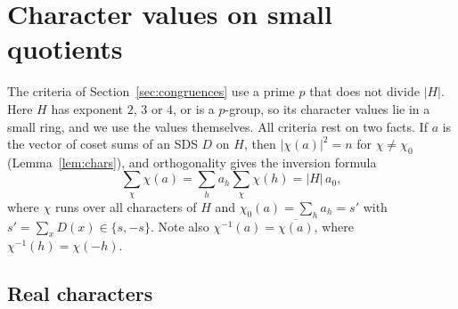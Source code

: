
\section{Character values on small quotients}\label{sec:characters}

The criteria of Section~\ref{sec:congruences} use a prime $p$ that does not divide $|H|$. Here
$H$ has exponent $2$, $3$ or $4$, or is a $p$-group, so its character values lie in a small ring,
and we use the values themselves. All criteria rest on two facts. If $a$ is the vector of coset
sums of an SDS $D$ on $H$, then $|\chi(a)|^2 = n$ for $\chi \ne \chi_0$
(Lemma~\ref{lem:chars}), and orthogonality gives the inversion formula
\begin{equation}\label{eq:inversion}
  \sum_{\chi} \chi(a) = \sum_h a_h \sum_\chi \chi(h) = |H|\, a_0 ,
\end{equation}
where $\chi$ runs over all characters of $H$ and $\chi_0(a) = \sum_h a_h = s'$ with
$s' = \sum_x D(x) \in \{s, -s\}$. Note also $\chi^{-1}(a) = \overline{\chi(a)}$, where
$\chi^{-1}(h) = \chi(-h)$.

\subsection{Real characters}

